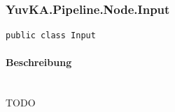 \subsubsection{YuvKA.Pipeline.Node.Input}

\begin{verbatim}
public class Input
\end{verbatim}

\paragraph{Beschreibung}~\\
TODO
